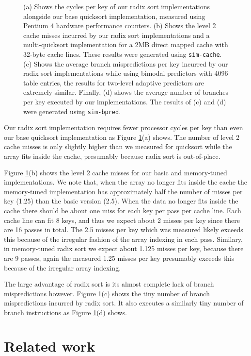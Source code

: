 \documentclass[acmtocl]{acmtrans2m}
\begin{document}
\begin{figure}
\caption{(a) Shows the cycles per key of our radix sort implementations alongside our base quicksort implementation, measured using Pentium 4
hardware performance counters. (b) Shows the level 2 cache 
misses incurred by our radix sort implementations and a multi-quicksort implementation for a 2MB direct mapped cache with 32-byte cache lines. These
results were generated using \texttt{sim-cache}.
(c) Shows the average branch mispredictions per key 
incurred by our radix sort implementations while using bimodal predictors with 4096 table entries, the results for two-level adaptive predictors are extremely
similar. Finally, (d) shows the average number of branches per key executed by 
our  implementations. The results of (c) and (d) were generated using \texttt{sim-bpred}.}
\label{radixsort_results_pictures}
\end{figure}

Our radix sort implementation requires fewer processor cycles per key than even our base quicksort 
implementation as Figure \ref{radixsort_results_pictures}(a) shows. The number of level 2 cache misses is only slightly higher than we measured for
quicksort while the array fits inside the cache, presumably because radix sort is out-of-place.

Figure \ref{radixsort_results_pictures}(b) shows the level 2 cache misses for our basic and memory-tuned implementations.
We note that, when the array no longer fits inside the cache the memory-tuned implementation has approximately half the number of misses per key
(1.25) than the basic version (2.5). When the data no longer fits inside the cache there should be about one miss for each key per pass per cache line.
Each cache line can fit 8 keys, and thus we expect about 2 misses per key since there are 16 passes in total. The 2.5 misses per key which was measured
likely exceeds this because of the irregular fashion of the array indexing in each pass. Similary, in memory-tuned radix sort we expect about 1.125
misses per key, because there are 9 passes, again the measured 1.25 misses per key presumably exceeds this because
of the irregular array indexing.

The large advantage of radix sort is its almost complete lack of branch mispredictions however. Figure \ref{radixsort_results_pictures}(c) shows the tiny
number of branch mispredictions incurred by radix sort. It also executes a similarly tiny number of branch instructions as 
Figure \ref{radixsort_results_pictures}(d) shows. 

\section{Related work} 
\label{RelatedWork}
\end{document}
